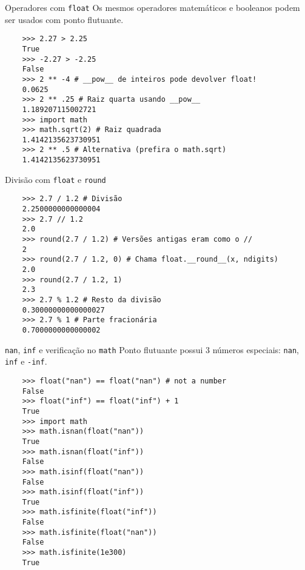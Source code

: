 \documentclass[utf8]{beamer}
\begin{document}
\begin{frame}[fragile]{Operadores com \texttt{float}}
  Os mesmos operadores matemáticos e booleanos
  podem ser usados com ponto flutuante.

  \begin{verbatim}
    >>> 2.27 > 2.25
    True
    >>> -2.27 > -2.25
    False
    >>> 2 ** -4 # __pow__ de inteiros pode devolver float!
    0.0625
    >>> 2 ** .25 # Raiz quarta usando __pow__
    1.189207115002721
    >>> import math
    >>> math.sqrt(2) # Raiz quadrada
    1.4142135623730951
    >>> 2 ** .5 # Alternativa (prefira o math.sqrt)
    1.4142135623730951
  \end{verbatim}
\end{frame}


\begin{frame}[fragile]{Divisão com \texttt{float} e \texttt{round}}
  \begin{verbatim}
    >>> 2.7 / 1.2 # Divisão
    2.2500000000000004
    >>> 2.7 // 1.2
    2.0
    >>> round(2.7 / 1.2) # Versões antigas eram como o //
    2
    >>> round(2.7 / 1.2, 0) # Chama float.__round__(x, ndigits)
    2.0
    >>> round(2.7 / 1.2, 1)
    2.3
    >>> 2.7 % 1.2 # Resto da divisão
    0.30000000000000027
    >>> 2.7 % 1 # Parte fracionária
    0.7000000000000002
  \end{verbatim}
\end{frame}


\begin{frame}[fragile]{\texttt{nan}, \texttt{inf} e
                       verificação no \texttt{math}}
  Ponto flutuante possui $3$ números especiais:
  \texttt{nan},
  \texttt{inf} e
  \texttt{-inf}.

  \begin{verbatim}
    >>> float("nan") == float("nan") # not a number
    False
    >>> float("inf") == float("inf") + 1
    True
    >>> import math
    >>> math.isnan(float("nan"))
    True
    >>> math.isnan(float("inf"))
    False
    >>> math.isinf(float("nan"))
    False
    >>> math.isinf(float("inf"))
    True
    >>> math.isfinite(float("inf"))
    False
    >>> math.isfinite(float("nan"))
    False
    >>> math.isfinite(1e300)
    True
  \end{verbatim}
\end{frame}
\end{document}
